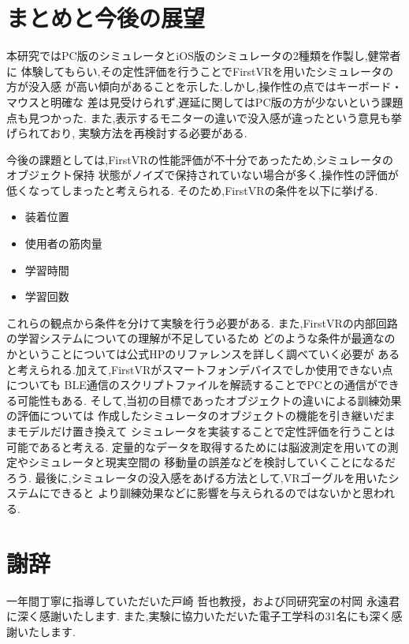 \documentclass{ltjsreport}
\begin{document}
\chapter{まとめと今後の展望}
	本研究ではPC版のシミュレータとiOS版のシミュレータの2種類を作製し,健常者に
	体験してもらい,その定性評価を行うことでFirstVRを用いたシミュレータの方が没入感
	が高い傾向があることを示した.しかし,操作性の点ではキーボード・マウスと明確な
	差は見受けられず,遅延に関してはPC版の方が少ないという課題点も見つかった.
	また,表示するモニターの違いで没入感が違ったという意見も挙げられており,
	実験方法を再検討する必要がある.

	今後の課題としては,FirstVRの性能評価が不十分であったため,シミュレータのオブジェクト保持
	状態がノイズで保持されていない場合が多く,操作性の評価が低くなってしまったと考えられる.
	そのため,FirstVRの条件を以下に挙げる.
	\begin{itemize}
		\item 装着位置
		\item 使用者の筋肉量
		\item 学習時間
		\item 学習回数
	\end{itemize}
	これらの観点から条件を分けて実験を行う必要がある.
	また,FirstVRの内部回路の学習システムについての理解が不足しているため
	どのような条件が最適なのかということについては公式HPのリファレンスを詳しく調べていく必要が
	あると考えられる.加えて,FirstVRがスマートフォンデバイスでしか使用できない点についても
	BLE通信のスクリプトファイルを解読することでPCとの通信ができる可能性もある.
	そして,当初の目標であったオブジェクトの違いによる訓練効果の評価については
	作成したシミュレータのオブジェクトの機能を引き継いだままモデルだけ置き換えて
	シミュレータを実装することで定性評価を行うことは可能であると考える.
	定量的なデータを取得するためには脳波測定を用いての測定やシミュレータと現実空間の
	移動量の誤差などを検討していくことになるだろう.
	最後に,シミュレータの没入感をあげる方法として,VRゴーグルを用いたシステムにできると
	より訓練効果などに影響を与えられるのではないかと思われる.
\clearpage

\chapter*{謝辞}
一年間丁寧に指導していただいた戸崎 哲也教授，および同研究室の村岡 永遠君に深く感謝いたします.
また,実験に協力いただいた電子工学科の31名にも深く感謝いたします.
\end{document}
